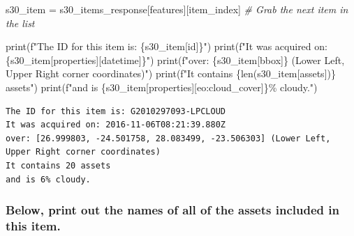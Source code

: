 \documentclass[
  letterpaper,
]{scrartcl}
\newenvironment{Shaded}{}{}
\newcommand{\BuiltInTok}[1]{#1}
\newcommand{\CommentTok}[1]{\textcolor[rgb]{0.38,0.63,0.69}{\textit{#1}}}
\newcommand{\NormalTok}[1]{#1}
\newcommand{\OperatorTok}[1]{\textcolor[rgb]{0.40,0.40,0.40}{#1}}
\newcommand{\SpecialCharTok}[1]{\textcolor[rgb]{0.25,0.44,0.63}{#1}}
\newcommand{\SpecialStringTok}[1]{\textcolor[rgb]{0.73,0.40,0.53}{#1}}
\newcommand{\StringTok}[1]{\textcolor[rgb]{0.25,0.44,0.63}{#1}}
\begin{document}
\begin{Shaded}
\begin{Highlighting}[]
\NormalTok{s30\_item }\OperatorTok{=}\NormalTok{ s30\_items\_response[}\StringTok{\textquotesingle{}features\textquotesingle{}}\NormalTok{][item\_index]  }\CommentTok{\# Grab the next item in the list}

\BuiltInTok{print}\NormalTok{(}\SpecialStringTok{f"The ID for this item is: }\SpecialCharTok{\{}\NormalTok{s30\_item[}\StringTok{\textquotesingle{}id\textquotesingle{}}\NormalTok{]}\SpecialCharTok{\}}\SpecialStringTok{"}\NormalTok{)}
\BuiltInTok{print}\NormalTok{(}\SpecialStringTok{f"It was acquired on: }\SpecialCharTok{\{}\NormalTok{s30\_item[}\StringTok{\textquotesingle{}properties\textquotesingle{}}\NormalTok{][}\StringTok{\textquotesingle{}datetime\textquotesingle{}}\NormalTok{]}\SpecialCharTok{\}}\SpecialStringTok{"}\NormalTok{)}
\BuiltInTok{print}\NormalTok{(}\SpecialStringTok{f"over: }\SpecialCharTok{\{}\NormalTok{s30\_item[}\StringTok{\textquotesingle{}bbox\textquotesingle{}}\NormalTok{]}\SpecialCharTok{\}}\SpecialStringTok{ (Lower Left, Upper Right corner coordinates)"}\NormalTok{)}
\BuiltInTok{print}\NormalTok{(}\SpecialStringTok{f"It contains }\SpecialCharTok{\{}\BuiltInTok{len}\NormalTok{(s30\_item[}\StringTok{\textquotesingle{}assets\textquotesingle{}}\NormalTok{])}\SpecialCharTok{\}}\SpecialStringTok{ assets"}\NormalTok{)}
\BuiltInTok{print}\NormalTok{(}\SpecialStringTok{f"and is }\SpecialCharTok{\{}\NormalTok{s30\_item[}\StringTok{\textquotesingle{}properties\textquotesingle{}}\NormalTok{][}\StringTok{\textquotesingle{}eo:cloud\_cover\textquotesingle{}}\NormalTok{]}\SpecialCharTok{\}}\SpecialStringTok{\% cloudy."}\NormalTok{)}
\end{Highlighting}
\end{Shaded}

\begin{verbatim}
The ID for this item is: G2010297093-LPCLOUD
It was acquired on: 2016-11-06T08:21:39.880Z
over: [26.999803, -24.501758, 28.083499, -23.506303] (Lower Left, Upper Right corner coordinates)
It contains 20 assets
and is 6% cloudy.
\end{verbatim}

\hypertarget{below-print-out-the-names-of-all-of-the-assets-included-in-this-item.}{%
\subsubsection{Below, print out the names of all of the assets included
in this
item.}\label{below-print-out-the-names-of-all-of-the-assets-included-in-this-item.}}
\end{document}
